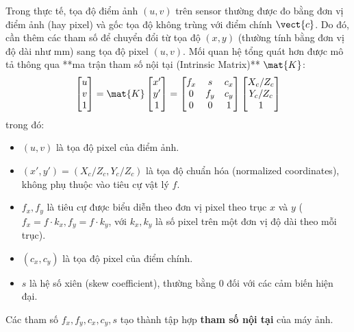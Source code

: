 Trong thực tế, tọa độ điểm ảnh $(u, v)$ trên sensor thường được đo bằng đơn vị điểm ảnh (hay pixel) và gốc tọa độ không trùng với điểm chính $\vect{c}$. Do đó, cần thêm các tham số để chuyển đổi từ tọa độ $(x, y)$ (thường tính bằng đơn vị độ dài như mm) sang tọa độ pixel $(u, v)$. Mối quan hệ tổng quát hơn được mô tả thông qua **ma trận tham số nội tại (Intrinsic Matrix)** $\mat{K}$:
\begin{equation} \label{eq:intrinsic_matrix}
\begin{bmatrix} u \\ v \\ 1 \end{bmatrix} = 
\mat{K} 
\begin{bmatrix} x' \\ y' \\ 1 \end{bmatrix} 
= 
\begin{bmatrix} f_x & s & c_x \\ 0 & f_y & c_y \\ 0 & 0 & 1 \end{bmatrix} 
\begin{bmatrix} X_c / Z_c \\ Y_c / Z_c \\ 1 \end{bmatrix}
\end{equation}
trong đó:
\begin{itemize}
    \item $(u, v)$ là tọa độ pixel của điểm ảnh.
    \item $(x', y') = (X_c/Z_c, Y_c/Z_c)$ là tọa độ chuẩn hóa (normalized coordinates), không phụ thuộc vào tiêu cự vật lý $f$.
    \item $f_x, f_y$ là tiêu cự được biểu diễn theo đơn vị pixel theo trục $x$ và $y$ ($f_x = f \cdot k_x, f_y = f \cdot k_y$, với $k_x, k_y$ là số pixel trên một đơn vị độ dài theo mỗi trục).
    \item $(c_x, c_y)$ là tọa độ pixel của điểm chính.
    \item $s$ là hệ số xiên (skew coefficient), thường bằng 0 đối với các cảm biến hiện đại.
\end{itemize}
Các tham số $f_x, f_y, c_x, c_y, s$ tạo thành tập hợp \textbf{tham số nội tại} của máy ảnh.

